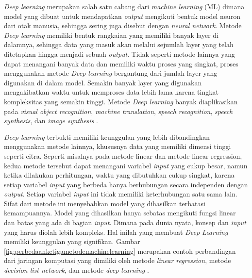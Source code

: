 \emph{Deep learning} merupakan salah satu cabang dari \emph{machine learning} (ML) dimana model yang dibuat untuk mendapatkan \emph{output} 
mengikuti bentuk model neuron dari otak manusia, sehingga sering juga disebut dengan \emph{neural network}. Metode \emph{Deep learning} 
memiliki bentuk rangkaian yang memiliki banyak layer di dalamnya, sehingga data yang masuk akan melalui sejumlah layer yang telah ditetapkan 
hingga menjadi sebuah \emph{output}. Tidak seperti metode lainnya yang dapat menangani banyak data dan memiliki waktu proses yang singkat, proses 
menggunakan metode \emph{Deep learning} bergantung dari jumlah layer yang digunakan di dalam model. Semakin banyak layer yang digunakan mengakibatkan 
waktu untuk memproses data lebih lama karena tingkat kompleksitas yang semakin tinggi. Metode \emph{Deep learning} banyak diaplikasikan pada 
\emph{visual object recognition}, \emph{machine translation}, \emph{speech recognition}, \emph{speech synthesis}, dan \emph{image synthesis} 
\parencite{Russel2021}.

\emph{Deep learning} terbukti memiliki keunggulan yang lebih dibandingkan menggunakan \linebreak metode lainnya, khususnya data yang memiliki dimensi 
tinggi seperti citra. Seperti misalnya pada metode linear dan metode linear regression, kedua metode tersebut dapat menangani variabel \emph{input} 
yang cukup besar, namun ketika dilakukan perhitungan, waktu yang dibutuhkan cukup singkat, karena setiap variabel \emph{input} yang berbeda hanya 
berhubungan secara independen dengan \emph{output}. Setiap variabel \emph{input} ini tidak memiliki keterhubungan satu sama lain. Sifat dari metode ini 
menyebabkan model yang dihasilkan terbatasi kemampuannya. Model yang dihasilkan hanya sebatas mengikuti fungsi linear dan batas yang ada di 
bagian \emph{input}. Dimana pada dunia nyata, konsep dan \emph{input} yang harus diolah lebih kompleks. Hal inilah yang membuat \emph{Deep Learning} memiliki 
keunggulan yang signifikan. Gambar \ref{fig:perbedaanketigametodemachinelearning} merupakan contoh perbandingan dari jaringan 
komputasi yang dimiliki oleh metode \emph{linear regression}, metode \emph{decision list network}, dan metode \emph{deep learning} \parencite{Russel2021}. 

